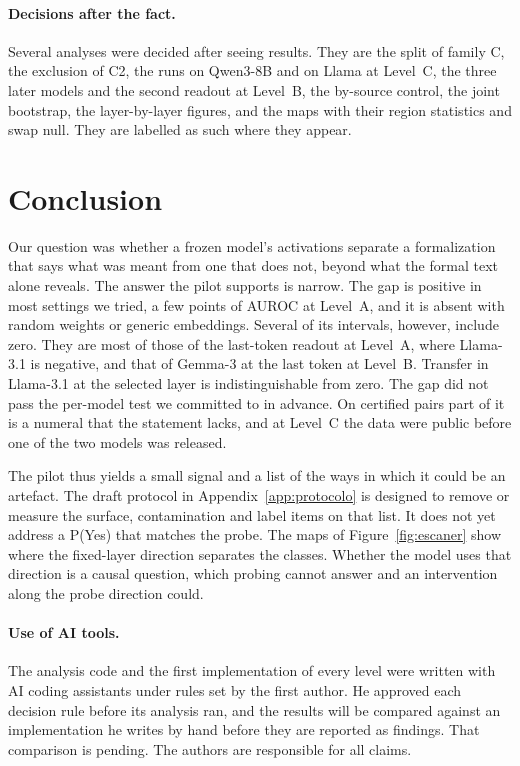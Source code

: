 \documentclass[10pt]{article}
\begin{document}
\paragraph{Decisions after the fact.}
Several analyses were decided after seeing results. They are the split of family C, the exclusion of C2, the runs
on Qwen3-8B and on Llama at Level~C, the three later models and the second readout at Level~B, the by-source
control, the joint bootstrap, the layer-by-layer figures, and the maps with their region statistics and swap null.
They are labelled as such where they appear.

\section{Conclusion}

Our question was whether a frozen model's activations separate a formalization that says what was meant from
one that does not, beyond what the formal text alone reveals. The answer the pilot supports is narrow. The gap is
positive in most settings we tried, a few points of AUROC at Level~A, and it is absent with random weights or
generic embeddings. Several of its intervals, however, include zero. They are most of those of the last-token
readout at Level~A, where Llama-3.1 is negative, and that of Gemma-3 at the last token at Level~B. Transfer in
Llama-3.1 at the selected layer is indistinguishable from zero. The gap did not pass the per-model test we
committed to in advance. On certified pairs part of it is a numeral that the statement lacks, and at Level~C the
data were public before one of the two models was released.

The pilot thus yields a small signal and a list of the ways in which it could be an artefact. The draft protocol in
Appendix~\ref{app:protocolo} is designed to remove or measure the surface, contamination and label items on that
list. It does not yet address a P(Yes) that matches the probe. The maps of Figure~\ref{fig:escaner} show where the
fixed-layer direction separates the classes. Whether the model uses that direction is a causal question, which
probing cannot answer and an intervention along the probe direction could.

\paragraph{Use of AI tools.}
The analysis code and the first implementation of every level were written with AI coding assistants under rules
set by the first author. He approved each decision rule before its analysis ran, and the results will be compared
against an implementation he writes by hand before they are reported as findings. That comparison is pending. The
authors are responsible for all claims.
\end{document}

